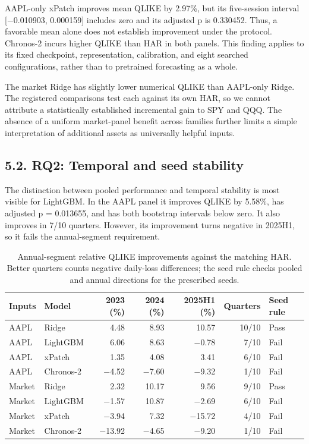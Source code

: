 AAPL-only xPatch improves mean QLIKE by 2.97\%, but its five-session
interval {[}−0.010903, 0.000159{]} includes zero and its adjusted p is
0.330452. Thus, a favorable mean alone does not establish improvement
under the protocol. Chronos-2 incurs higher QLIKE than HAR in both
panels. This finding applies to its fixed checkpoint, representation,
calibration, and eight searched configurations, rather than to
pretrained forecasting as a whole.

The market Ridge has slightly lower numerical QLIKE than AAPL-only
Ridge. The registered comparisons test each against its own HAR, so we
cannot attribute a statistically established incremental gain to SPY and
QQQ. The absence of a uniform market-panel benefit across families
further limits a simple interpretation of additional assets as
universally helpful inputs.

\subsection{5.2. RQ2: Temporal and seed
stability}\label{rq2-temporal-and-seed-stability}

The distinction between pooled performance and temporal stability is
most visible for LightGBM. In the AAPL panel it improves QLIKE by
5.58\%, has adjusted p = 0.013655, and has both bootstrap intervals
below zero. It also improves in 7/10 quarters. However, its improvement
turns negative in 2025H1, so it fails the annual-segment requirement.

\begin{table}[!t]
\centering
\footnotesize
\caption{Annual-segment relative QLIKE improvements against the matching HAR. Better quarters counts negative daily-loss differences; the seed rule checks pooled and annual directions for the prescribed seeds.}
\label{tab:results-4}
\begin{tabular}{llrrrrl}
\toprule
Inputs & Model & 2023 (\%) & 2024 (\%) & 2025H1 (\%) & Quarters & Seed rule \\
\midrule
AAPL & Ridge & 4.48 & 8.93 & 10.57 & 10/10 & Pass \\
AAPL & LightGBM & 6.06 & 8.63 & −0.78 & 7/10 & Fail \\
AAPL & xPatch & 1.35 & 4.08 & 3.41 & 6/10 & Fail \\
AAPL & Chronos-2 & −4.52 & −7.60 & −9.32 & 1/10 & Fail \\
Market & Ridge & 2.32 & 10.17 & 9.56 & 9/10 & Pass \\
Market & LightGBM & −1.57 & 10.87 & −2.69 & 6/10 & Fail \\
Market & xPatch & −3.94 & 7.32 & −15.72 & 4/10 & Fail \\
Market & Chronos-2 & −13.92 & −4.65 & −9.20 & 1/10 & Fail \\
\bottomrule
\end{tabular}
\end{table}


